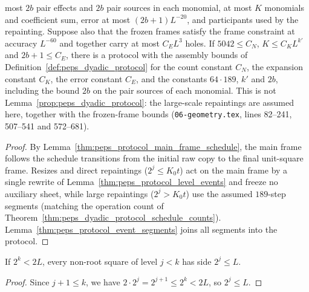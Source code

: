 \begin{lemma}
    most $2b$ pair effects and $2b$ pair sources in each monomial, at most $K$
    monomials and coefficient sum, error at most $(2b+1)L^{-20}$, and
    participants used by the repainting. Suppose also that the frozen frames
    satisfy the frame constraint at accuracy $L^{-60}$ and together carry at
    most $C_EL^3$ holes. If $5042\le C_N$, $K\le C_KL^{k'}$ and $2b+1\le C_E$,
    there is a protocol with the assembly bounds of
    Definition~\ref{def:peps_dyadic_protocol} for the count constant $C_N$, the
    expansion constant $C_K$, the error constant $C_E$, and the constants
    $64\cdot189$, $k'$ and $2b$, including the bound $2b$ on the pair sources
    of each monomial. This is not
    Lemma~\ref{prop:peps_dyadic_protocol}: the large-scale repaintings are
    assumed here, together with the frozen-frame bounds
    (\texttt{06-geometry.tex}, lines 82--241, 507--541 and 572--681).
\end{lemma}

\begin{proof}\leanok
    By Lemma~\ref{thm:peps_protocol_main_frame_schedule}, the main frame follows the schedule transitions from the initial raw copy to the final unit-square frame. Resizes and direct repaintings ($2^j\le K_0t$) act on the main frame by a single rewrite of Lemma~\ref{thm:peps_protocol_level_events} and freeze no auxiliary sheet, while large repaintings ($2^j>K_0t$) use the assumed $189$-step segments (matching the operation count of Theorem~\ref{thm:peps_dyadic_protocol_schedule_counts}). Lemma~\ref{thm:peps_protocol_event_segments} joins all segments into the protocol.
\end{proof}

\begin{lemma}
    \label{thm:peps_repainted_square_side_bound}
    \leanok
    If $2^k<2L$, every non-root square of level $j<k$ has side $2^j\le L$.
\end{lemma}

\begin{proof}\leanok
    Since $j+1\le k$, we have $2\cdot2^j=2^{j+1}\le2^k<2L$, so $2^j\le L$.
\end{proof}

